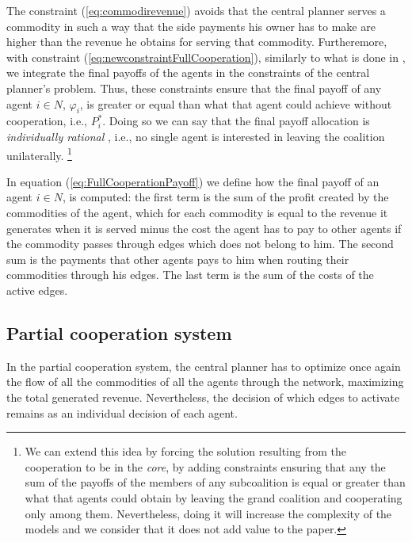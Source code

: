 \documentclass[review]{elsarticle}
\begin{document}
\begin{enumerate}[(a)]
The constraint (\ref{eq:commodirevenue}) avoids that the central planner serves a commodity in such a way that the side payments his owner has to make are higher than the revenue he obtains for serving that commodity. Furtheremore, with constraint (\ref{eq:newconstraintFullCooperation}), similarly to what is done in \cite{VANOVERMEIRE2014125}, we integrate the final payoffs of the agents in the constraints of the central planner's problem. Thus, these constraints  ensure that the final payoff of any agent $i\in N$, $\varphi_i$, is greater or equal than what that agent could achieve without cooperation, i.e., $P_i^*$.  Doing so we can say that the final payoff allocation is \emph{individually rational} \cite{GONZALEZ2010}, i.e., no single agent is interested in leaving the coalition unilaterally.  \footnote{We can extend this idea by forcing the solution resulting from the cooperation to be in the \emph{core}, by adding constraints ensuring that any the sum of the payoffs of the members of any subcoalition is equal or greater than what that agents could obtain by leaving the grand coalition and cooperating only among them. Nevertheless, doing it will increase the complexity of the models and we consider that it does not add value to the paper.}
	


\end{enumerate}


In equation (\ref{eq:FullCooperationPayoff}) we define how the final payoff of an agent $i\in N$, is computed: the first term is the sum of the profit created by the commodities of the agent, which for each commodity is equal to the revenue it
generates when it is served minus the cost the agent has to pay to other agents
if the commodity passes through edges which does not belong to him. The second
sum is the payments that other agents pays to him when routing their commodities
through his edges. The last term is the sum of the costs of the active edges.


\subsection{Partial cooperation system}

In the partial cooperation system, the central planner has to optimize once
again the flow of all the commodities of all the agents through the network,
maximizing the total generated revenue. Nevertheless, the decision of which
edges to activate remains as an individual decision of each agent.
\end{document}
